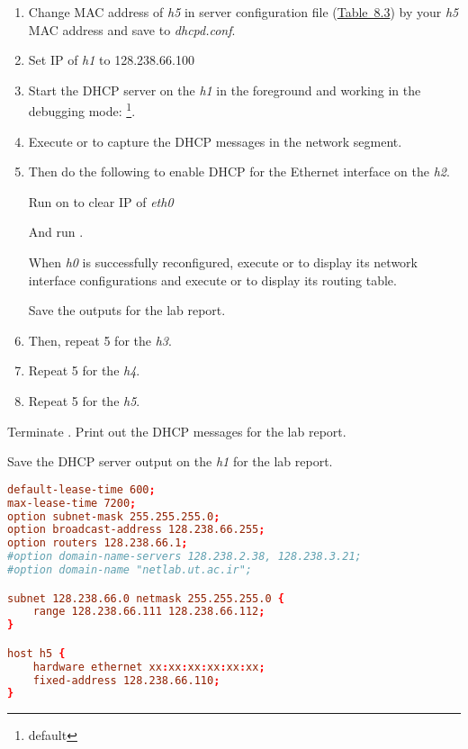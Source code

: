 \documentclass{../UTNetLab}
\begin{document}
\begin{enumerate}
    \item Change MAC address of \textit{h5} in server configuration file (\hyperref[tab:8.3]{Table~8.3}) by your \textit{h5} MAC address and save to \textit{dhcpd.conf}.

    \item Set IP of \textit{h1} to {128.238.66.100}

    \item Start the DHCP server on the \textit{h1} in the foreground and working in the debugging mode: \footnote{default }.

    \item Execute  or  to capture the DHCP messages in the network segment.

    \item Then do the following to enable DHCP for the Ethernet interface on the \textit{h2}.

          Run  on  to clear IP of \textit{eth0}

          And run .

          When \textit{h0} is successfully reconfigured, execute  or  to display its
          network interface configurations and execute  or  to display its routing table.

          Save the outputs for the lab report.

    \item Then, repeat 5 for the \textit{h3}.

    \item Repeat 5 for the \textit{h4}.

    \item Repeat 5 for the \textit{h5}.
\end{enumerate}

Terminate .
Print out the DHCP messages for the lab report.

Save the DHCP server output on the \textit{h1} for the lab report.

\begin{lstlisting}[language={conf}, caption={A DHCP server configuration file (Table~8.3)\label{tab:8.3}},emph={xx}]
default-lease-time 600;
max-lease-time 7200;
option subnet-mask 255.255.255.0;
option broadcast-address 128.238.66.255;
option routers 128.238.66.1;
#option domain-name-servers 128.238.2.38, 128.238.3.21;
#option domain-name "netlab.ut.ac.ir";

subnet 128.238.66.0 netmask 255.255.255.0 {
    range 128.238.66.111 128.238.66.112;
}

host h5 {
    hardware ethernet xx:xx:xx:xx:xx:xx;
    fixed-address 128.238.66.110;
}
    \end{lstlisting}
\end{document}
